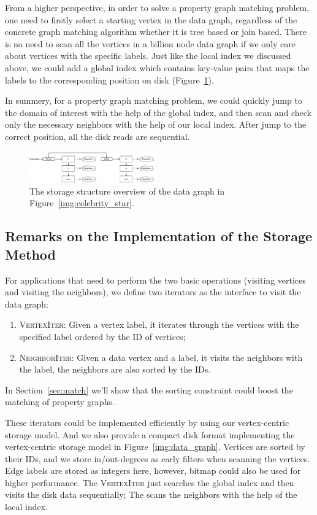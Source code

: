 From a higher perspective, in order to solve a property graph matching problem,
one need to firstly select a starting vertex in the data graph,
regardless of the concrete graph matching algorithm whether it is tree based or join based.
There is no need to scan all the vertices in a billion node data graph if we only care about vertices with the specific labels.
Just like the local index we discussed above, we could add a global index which contains key-value pairs that maps the labels to the corresponding position on disk (Figure~\ref{img:data_vertices}).

In summery, for a property graph matching problem, we could quickly jump to the domain of interest with the help of the global index, and then scan and check only the necessary neighbors with the help of our local index.
After jump to the correct position, all the disk reads are sequential.
\begin{figure}[ht]
  \centering
  \includegraphics[width=0.48\textwidth]{img/data_vertices.pdf}
  \caption{The storage structure overview of the data graph in Figure~\ref{img:celebrity_star}.}\label{img:data_vertices}
\end{figure}
\subsection{Remarks on the Implementation of the Storage Method}
For applications that need to perform the two basic operations (visiting vertices and visiting the neighbors),
we define two iterators as the interface to visit the data graph:
\begin{enumerate}[noitemsep]
\item \textsc{VertexIter}: Given a vertex label, it iterates through the vertices with the specified label ordered by the ID of vertices;
\item \textsc{NeighborIter}: Given a data vertex and a label, it visits the neighbors with the label, the neighbors are also sorted by the IDs.
\end{enumerate}
In Section~\ref{sec:match} we'll show that the sorting constraint could boost the matching of property graphs.

These iterators could be implemented efficiently by using our vertex-centric storage model.
And we also provide a compact disk format implementing the vertex-centric storage model in Figure~\ref{img:data_graph}.
Vertices are sorted by their IDs, and we store in/out-degrees as early filters when scanning the vertices.
Edge labels are stored as integers here, however, bitmap could also be used for higher performance.
The \textsc{VertexIter} just searches the global index and then visits the disk data sequentially;
The  scans the neighbors with the help of the local index.

